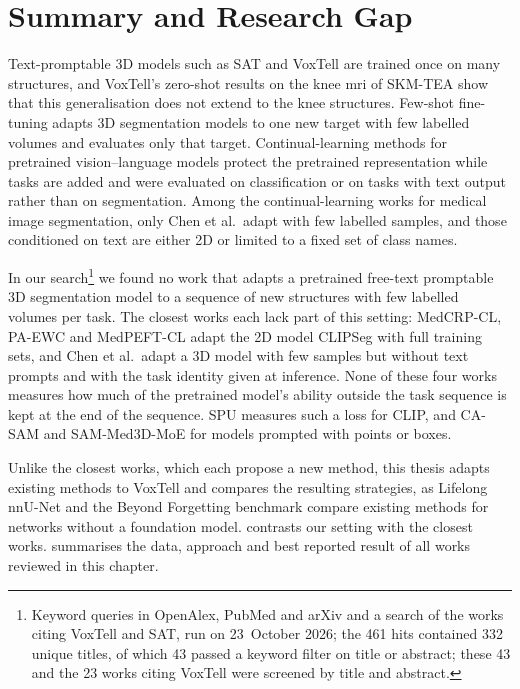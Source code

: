 \section{Summary and Research Gap}
\label{sec:sota-summary}

Text-promptable 3D models such as SAT and VoxTell are trained once on many structures, and VoxTell's zero-shot results on the knee \gls{mri} of SKM-TEA show that this generalisation does not extend to the knee structures.
Few-shot fine-tuning adapts 3D segmentation models to one new target with few labelled volumes and evaluates only that target.
Continual-learning methods for pretrained vision--language models protect the pretrained representation while tasks are added and were evaluated on classification or on tasks with text output rather than on segmentation.
Among the continual-learning works for medical image segmentation, only Chen et al.\ adapt with few labelled samples, and those conditioned on text are either 2D or limited to a fixed set of class names.



In our search\footnote{Keyword queries in OpenAlex, PubMed and arXiv and a search of the works citing VoxTell and SAT, run on 23~October 2026; the 461 hits contained 332 unique titles, of which 43 passed a keyword filter on title or abstract; these 43 and the 23 works citing VoxTell were screened by title and abstract.} we found no work that adapts a pretrained free-text promptable 3D segmentation model to a sequence of new structures with few labelled volumes per task.
The closest works each lack part of this setting: MedCRP-CL, PA-EWC and MedPEFT-CL adapt the 2D model CLIPSeg with full training sets, and Chen et al.\ adapt a 3D model with few samples but without text prompts and with the task identity given at inference.
None of these four works measures how much of the pretrained model's ability outside the task sequence is kept at the end of the sequence.
SPU measures such a loss for CLIP, and CA-SAM and SAM-Med3D-MoE for models prompted with points or boxes.

Unlike the closest works, which each propose a new method, this thesis adapts existing methods to VoxTell and compares the resulting strategies, as Lifelong nnU-Net and the Beyond Forgetting benchmark compare existing methods for networks without a foundation model.
 contrasts our setting with the closest works.
 summarises the data, approach and best reported result of all works reviewed in this chapter.

\clearpage

